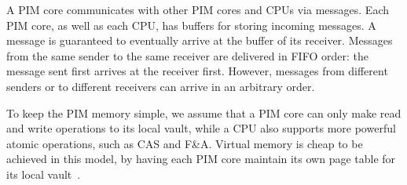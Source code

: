 A PIM core communicates with other PIM cores and CPUs via messages.
Each PIM core, as well as each CPU, has buffers for storing incoming messages.
A message is guaranteed to eventually arrive at the buffer of its receiver.
Messages from the same sender to the same receiver are delivered in FIFO order: 
the message sent first arrives at the receiver first. 
However, messages from different senders or to different receivers can arrive in an arbitrary order. 

To keep the PIM memory simple, we assume that a PIM core can only make read and write operations 
to its local vault, while a CPU also supports more powerful atomic operations, such as CAS and F\&A.
Virtual memory is cheap to be achieved in this model, 
by having each PIM core maintain its own page table for its local vault~\cite{hsieh2016accelerating}.